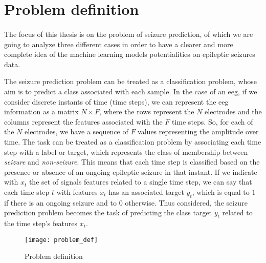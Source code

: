 
\section{Problem definition} \label{sec: problem_definition}
\paragraph{} The focus of this thesis is on the problem of seizure prediction, of which we are going to analyze three different cases in order to have a clearer and more complete idea of the machine learning models potentialities on epileptic seizures data.

The seizure prediction problem can be treated as a classification problem, whose aim is to predict a class associated with each sample. In the case of an \acs{eeg}, if we consider discrete instants of time (time steps), we can represent the \acs{eeg} information as a matrix $N \times F$, where the rows represent the $N$ electrodes and the columns represent the features associated with the $F$ time steps. So, for each of the $N$ electrodes, we have a sequence of $F$ values representing the amplitude over time. The task can be treated as a classification problem by associating each time step with a label or target, which represents the class of membership between \textit{seizure} and \textit{non-seizure}. This means that each time step is classified based on the presence or absence of an ongoing epileptic seizure in that instant. If we indicate with $x_t$ the set of signals features related to a single time step, we can say that each time step $t$ with features $x_t$ has an associated target $y_t$, which is equal to $1$ if there is an ongoing seizure and to $0$ otherwise. Thus considered, the seizure prediction problem becomes the task of predicting the class target $y_t$ related to the time step's features $x_t$.

\begin{figure}[htbp]
    \centering
    \texttt{[image: problem\_def]}
    \caption{Problem definition}
    \label{fig:problem_def}
\end{figure}

